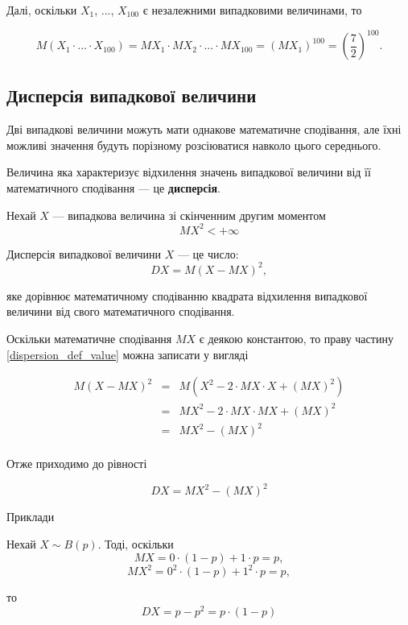 Далі, оскільки $X_1$, ..., $X_{100}$ є незалежними
випадковими величинами, то

$$M(X_1 \cdot ... \cdot X_{100})
= MX_1 \cdot MX_2 \cdot ... \cdot MX_{100}
= (MX_1)^{100}
= (\frac{7}{2})^{100}.$$


\subsection{Дисперсія випадкової величини}

Дві випадкові величини можуть мати однакове математичне
сподівання, але їхні можливі значення будуть порізному
розсіюватися навколо цього середнього.

\begin{definition}
    Величина яка характеризує відхилення значень випадкової
    величини від її математичного сподівання --- це
    \textbf{дисперсія}.
\end{definition}


Нехай $X$ --- випадкова величина зі скінченним другим моментом
$$MX^2 < +\infty$$

Дисперсія випадкової величини $X$ --- це число:
\begin{equation}
    \label{dispersion_def_value}
    DX = M(X - MX)^2,
\end{equation}

яке дорівнює математичному сподіванню
квадрата відхилення випадкової величини
від свого математичного сподівання.

Оскільки математичне сподівання $MX$ є
деякою константою, то праву частину
\ref{dispersion_def_value} можна записати
у вигляді

$$\begin{array}{rcl}
    M(X - MX)^2 & = & M(X^2 - 2 \cdot MX \cdot X + (MX)^2) \\
    & = & MX^2 - 2 \cdot MX \cdot MX + (MX)^2 \\
    & = & MX^2 - (MX)^2 \\
\end{array}$$

Отже приходимо до рівності 

\begin{equation}
    DX = MX^2 - (MX)^2
\end{equation}

Приклади
\begin{example}
    Нехай $X \sim B(p)$. Тоді, оскільки 
    $$MX = 0 \cdot (1-p) + 1 \cdot p = p,$$
    $$MX^2 = 0^2 \cdot (1-p) + 1^2 \cdot p = p,$$
    
    то 
    $$DX = p - p^2 = p \cdot (1-p)$$
\end{example}

